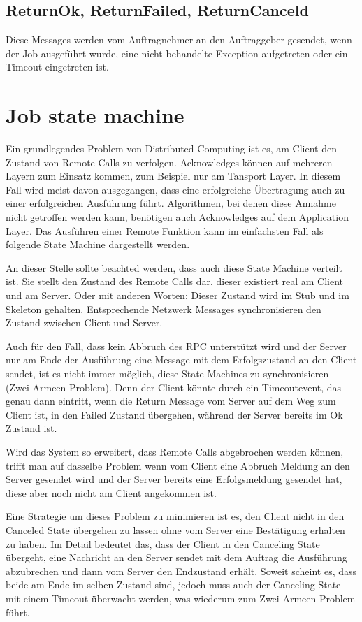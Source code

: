 \subsection{ReturnOk, ReturnFailed, ReturnCanceld}
Diese Messages werden vom Auftragnehmer an den Auftraggeber gesendet, wenn der Job ausgeführt wurde, eine nicht behandelte Exception aufgetreten oder ein Timeout eingetreten ist.


\section{Job state machine}
Ein grundlegendes Problem von Distributed Computing ist es, am Client den Zustand von Remote Calls zu verfolgen.
Acknowledges können auf mehreren Layern zum Einsatz kommen, zum Beispiel nur am Tansport Layer.
In diesem Fall wird meist davon ausgegangen, dass eine erfolgreiche Übertragung auch zu einer erfolgreichen Ausführung führt.
Algorithmen, bei denen diese Annahme nicht getroffen werden kann, benötigen auch Acknowledges auf dem Application Layer.
Das Ausführen einer Remote Funktion kann im einfachsten Fall als folgende State Machine dargestellt werden.

An dieser Stelle sollte beachted werden, dass auch diese State Machine verteilt ist.
Sie stellt den Zustand des Remote Calls dar, dieser existiert real am Client und am Server.
Oder mit anderen Worten: Dieser Zustand wird im Stub und im Skeleton gehalten.
Entsprechende Netzwerk Messages synchronisieren den Zustand zwischen Client und Server.

Auch für den Fall, dass kein Abbruch des RPC unterstützt wird und der Server nur am Ende der Ausführung eine Message mit dem Erfolgszustand an den Client sendet, ist es nicht immer möglich, diese State Machines zu synchronisieren (Zwei-Armeen-Problem).
Denn der Client könnte durch ein Timeoutevent, das genau dann eintritt, wenn die Return Message vom Server auf dem Weg zum Client ist, in den Failed Zustand übergehen, während der Server bereits im Ok Zustand ist.

Wird das System so erweitert, dass Remote Calls abgebrochen werden können, trifft man auf dasselbe Problem wenn vom Client eine Abbruch Meldung an den Server gesendet wird und der Server bereits eine Erfolgsmeldung gesendet hat, diese aber noch nicht am Client angekommen ist.

Eine Strategie um dieses Problem zu minimieren ist es, den Client nicht in den Canceled State übergehen zu lassen ohne vom Server eine Bestätigung erhalten zu haben.
Im Detail bedeutet das, dass der Client in den Canceling State übergeht, eine Nachricht an den Server sendet mit dem Auftrag die Ausführung abzubrechen und dann vom Server den Endzustand erhält.
Soweit scheint es, dass beide am Ende im selben Zustand sind, jedoch muss auch der Canceling State mit einem Timeout überwacht werden, was wiederum zum Zwei-Armeen-Problem führt.

